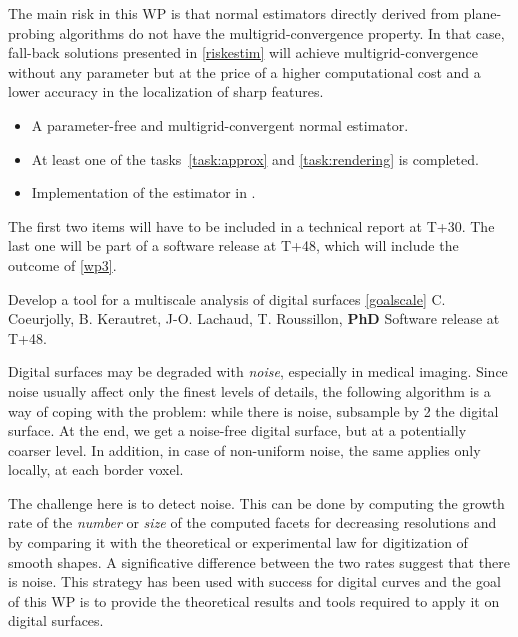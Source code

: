 \Risks
The main risk in this WP is that normal estimators
directly derived from plane-probing algorithms do not have the multigrid-convergence
property. In that case, fall-back solutions presented in \ref{riskestim} will achieve
multigrid-convergence without any parameter but at the price of a higher computational
cost and a lower accuracy in the localization of sharp features. 

\Success
\begin{itemize}
  \item A parameter-free and multigrid-convergent normal estimator.
  \item At least one of the tasks~\ref{task:approx} and \ref{task:rendering} is completed. 
  \item Implementation of the estimator in \DGtal.
\end{itemize}

The first two items will have to be included in a technical report at T+30.
The last one will be part of a software release at T+48, which will include
the outcome of \ref{wp3}. 

  

\medskip
{}
   {Develop a tool for a multiscale analysis of digital surfaces \ref{goalscale}}
   {C. Coeurjolly, B. Kerautret, J-O. Lachaud, T. Roussillon, \textbf{PhD}}
   {Software release at T+48.}
\medskip

Digital surfaces may be degraded with \emph{noise}, especially in medical imaging.
Since noise usually affect only the finest levels of details, the following algorithm
is a way of coping with the problem: while there is noise, subsample by 2 the digital surface.
At the end, we get a noise-free digital surface, but at a potentially coarser level.
In addition, in case of non-uniform noise, the same applies only locally, \ie at each border voxel.  

The challenge here is to detect noise. This can be done by computing the growth rate of the
\emph{number} or \emph{size} of the computed facets for decreasing resolutions
and by comparing it with the theoretical or experimental law for digitization of smooth shapes.
A significative difference between the two rates suggest that there is noise.
This strategy has been used with success for digital curves \cite{Kerautret2012}
and the goal of this WP is to provide the theoretical results and tools required to apply it on digital surfaces. 

